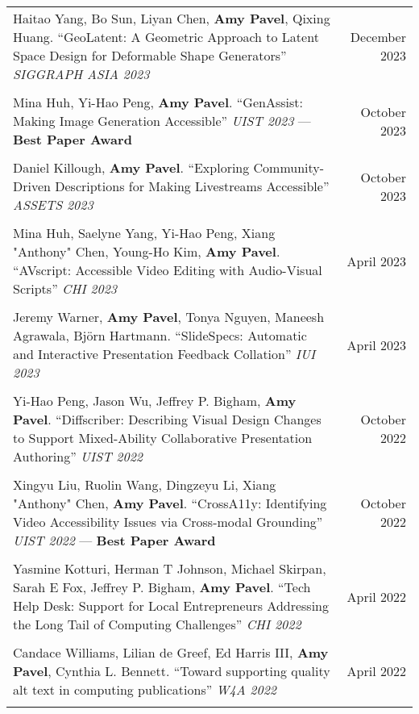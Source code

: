 \begin{longtable}{Xr}
	Haitao Yang, Bo Sun, Liyan Chen, \textbf{Amy Pavel}, Qixing Huang. ``GeoLatent: A Geometric Approach to Latent Space Design for Deformable Shape Generators'' \textit{SIGGRAPH ASIA 2023} & December 2023 \\
	\\

	Mina Huh, Yi-Hao Peng, \textbf{Amy Pavel}. ``GenAssist: Making Image Generation Accessible'' \textit{UIST 2023} --- \textbf{Best Paper Award} & October 2023 \\
	\\

	Daniel Killough, \textbf{Amy Pavel}. ``Exploring Community-Driven Descriptions for Making Livestreams Accessible'' \textit{ASSETS 2023} & October 2023 \\
	\\

	Mina Huh, Saelyne Yang, Yi-Hao Peng, Xiang "Anthony" Chen, Young-Ho Kim, \textbf{Amy Pavel}. ``AVscript: Accessible Video Editing with Audio-Visual Scripts'' \textit{CHI 2023} & April 2023 \\
	\\

	Jeremy Warner, \textbf{Amy Pavel}, Tonya Nguyen, Maneesh Agrawala, Björn Hartmann. ``SlideSpecs: Automatic and Interactive Presentation Feedback Collation'' \textit{IUI 2023} & April 2023 \\
	\\

	Yi-Hao Peng, Jason Wu, Jeffrey P. Bigham, \textbf{Amy Pavel}. ``Diffscriber: Describing Visual Design Changes to Support Mixed-Ability Collaborative Presentation Authoring'' \textit{UIST 2022} & October 2022 \\
	\\

	Xingyu Liu, Ruolin Wang, Dingzeyu Li, Xiang "Anthony" Chen, \textbf{Amy Pavel}. ``CrossA11y: Identifying Video Accessibility Issues via Cross-modal Grounding'' \textit{UIST 2022} --- \textbf{Best Paper Award} & October 2022 \\
	\\

	Yasmine Kotturi, Herman T Johnson, Michael Skirpan, Sarah E Fox, Jeffrey P. Bigham, \textbf{Amy Pavel}. ``Tech Help Desk: Support for Local Entrepreneurs Addressing the Long Tail of Computing Challenges'' \textit{CHI 2022} & April 2022 \\
	\\

	Candace Williams, Lilian de Greef, Ed Harris III, \textbf{Amy Pavel}, Cynthia L. Bennett. ``Toward supporting quality alt text in computing publications'' \textit{W4A 2022} & April 2022 \\
	\\


\end{longtable}
